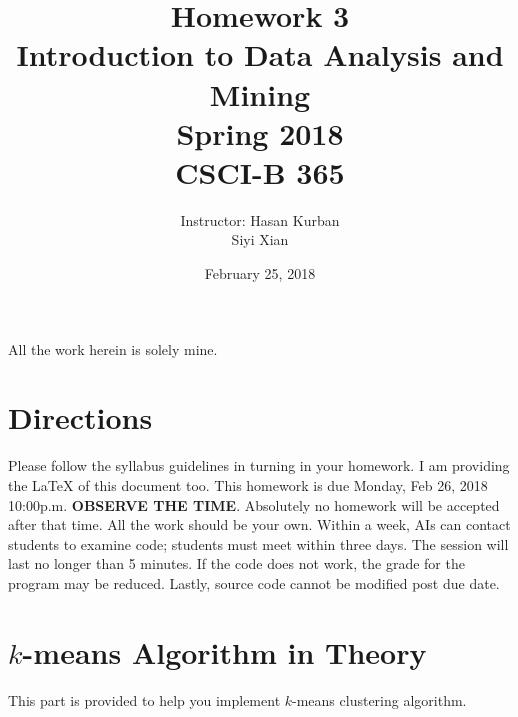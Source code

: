 \documentclass{article}
\begin{document}
\title{Homework 3\\ Introduction to Data Analysis and Mining \\ Spring 2018\\ CSCI-B 365}         %
\author{Instructor: Hasan Kurban\\ Siyi Xian}        %
\date{February 25, 2018}          %
\maketitle
All the work herein is solely mine.
\makeatother     %
\pagestyle{plain}
\section*{Directions}
Please follow the syllabus guidelines in turning in your homework.  I am providing the \LaTeX{} of this document too. This homework is due Monday, Feb  26, 2018 10:00p.m. \textbf{OBSERVE THE  TIME}. Absolutely no homework will be accepted after that time. All the work should be your own.  Within a week, AIs can contact students to examine code; students must meet within three days.  The session will last no longer than 5 minutes.  If the code does not work, the grade for the program may be reduced.  Lastly, source code cannot be
 modified post due date.
 
 
 
\section*{ $k$-means Algorithm in Theory}
This part is provided to help you implement $k$-means clustering algorithm.
\end{document}
